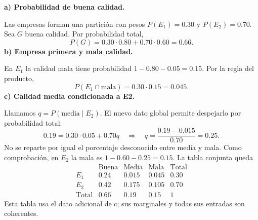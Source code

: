\textbf{a) Probabilidad de buena calidad.}\par\nopagebreak[4]
Las empresas forman una partición con pesos $P(E_1)=0.30$ y $P(E_2)=0.70$. Sea $G$ buena calidad. Por probabilidad total,
\[
\boxed{P(G)=0.30\cdot0.80+0.70\cdot0.60=0.66.}
\]
\textbf{b) Empresa primera y mala calidad.}\par\nopagebreak[4]
En $E_1$ la calidad mala tiene probabilidad $1-0.80-0.05=0.15$. Por la regla del producto,
\[
\boxed{P(E_1\cap\text{mala})=0.30\cdot0.15=0.045.}
\]
\textbf{c) Calidad media condicionada a E2.}\par\nopagebreak[4]
Llamamos $q=P(\text{media}\mid E_2)$. El nuevo dato global permite despejarlo por probabilidad total:
\[
0.19=0.30\cdot0.05+0.70q
\quad\Longrightarrow\quad
\boxed{q=\frac{0.19-0.015}{0.70}=0.25.}
\]
No se reparte por igual el porcentaje desconocido entre media y mala. Como comprobación, en $E_2$ la mala es $1-0.60-0.25=0.15$. La tabla conjunta queda
\[
\begin{array}{c|rrr|r}
&\text{Buena}&\text{Media}&\text{Mala}&\text{Total}\\\hline
E_1&0.24&0.015&0.045&0.30\\
E_2&0.42&0.175&0.105&0.70\\\hline
\text{Total}&0.66&0.19&0.15&1
\end{array}
\]
Esta tabla usa el dato adicional de c; sus marginales y todas sus entradas son coherentes.
